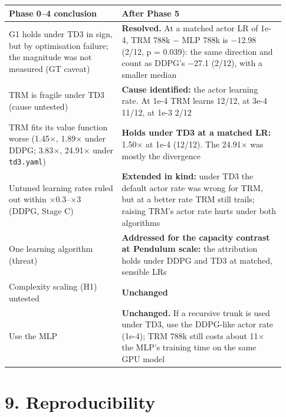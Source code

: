 \documentclass[11pt]{article}
\begin{document}
\begin{center}\small\begin{tabular}{>{\raggedright\arraybackslash}p{0.380\linewidth}>{\raggedright\arraybackslash}p{0.554\linewidth}}
\toprule
Phase 0--4 conclusion & After Phase 5 \\
\midrule
G1 holds under TD3 in sign, but by optimisation failure; the magnitude was not measured (GT caveat) & \textbf{Resolved.} At a matched actor LR of 1e-4, TRM 788k $-$ MLP 788k is $-$12.98 (2/12, p = 0.039): the same direction and count as DDPG's $-$27.1 (2/12), with a smaller median \\
TRM is fragile under TD3 (cause untested) & \textbf{Cause identified:} the actor learning rate. At 1e-4 TRM learns 12/12, at 3e-4 11/12, at 1e-3 2/12 \\
TRM fits its value function worse (1.45$\times$, 1.89$\times$ under DDPG; 3.83$\times$, 24.91$\times$ under \texttt{td3.yaml}) & \textbf{Holds under TD3 at a matched LR:} 1.50$\times$ at 1e-4 (12/12). The 24.91$\times$ was mostly the divergence \\
Untuned learning rates ruled out within $\times$0.3--$\times$3 (DDPG, Stage C) & \textbf{Extended in kind:} under TD3 the default actor rate was wrong for TRM, but at a better rate TRM still trails; raising TRM's actor rate hurts under both algorithms \\
One learning algorithm (threat) & \textbf{Addressed for the capacity contrast at Pendulum scale:} the attribution holds under DDPG and TD3 at matched, sensible LRs \\
Complexity scaling (H1) untested & \textbf{Unchanged} \\
Use the MLP & \textbf{Unchanged.} If a recursive trunk is used under TD3, use the DDPG-like actor rate (1e-4); TRM 788k still costs about 11$\times$ the MLP's training time on the same GPU model \\
\bottomrule
\end{tabular}\end{center}



\section*{9. Reproducibility}
\end{document}
